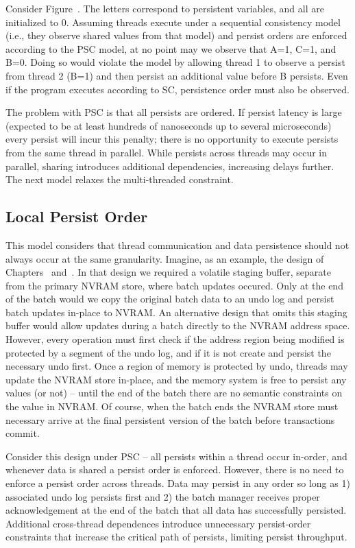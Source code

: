 Consider Figure~.
The letters correspond to persistent variables, and all are initialized to 0.
Assuming threads execute under a sequential consistency model (i.e., they observe shared values from that model) and persist orders are enforced according to the PSC model, at no point may we observe that A=1, C=1, and B=0.
Doing so would violate the model by allowing thread 1 to observe a persist from thread 2 (B=1) and then persist an additional value before B persists.
Even if the program executes according to SC, persistence order must also be observed.

The problem with PSC is that all persists are ordered.
If persist latency is large (expected to be at least hundreds of nanoseconds up to several microseconds) every persist will incur this penalty; there is no opportunity to execute persists from the same thread in parallel.
While persists across threads may occur in parallel, sharing introduces additional dependencies, increasing delays further.
The next model relaxes the multi-threaded constraint.

\subsection{Local Persist Order}
\label{sec:PMC:PersistenceModels:LPO}

This model considers that thread communication and data persistence should not always occur at the same granularity.
Imagine, as an example, the \GroupCommit design of Chapters~ and~.
In that design we required a volatile staging buffer, separate from the primary NVRAM store, where batch updates occured.
Only at the end of the batch would we copy the original batch data to an undo log and persist batch updates in-place to NVRAM.
An alternative design that omits this staging buffer would allow updates during a batch directly to the NVRAM address space.
However, every operation must first check if the address region being modified is protected by a segment of the undo log, and if it is not create and persist the necessary undo first.
Once a region of memory is protected by undo, threads may update the NVRAM store in-place, and the memory system is free to persist any values (or not) -- until the end of the batch there are no semantic constraints on the value in NVRAM.
Of course, when the batch ends the NVRAM store must necessary arrive at the final persistent version of the batch before transactions commit.

Consider this design under PSC -- all persists within a thread occur in-order, and whenever data is shared a persist order is enforced.
However, there is no need to enforce a persist order across threads.
Data may persist in any order so long as 1) associated undo log persists first and 2) the batch manager receives proper acknowledgement at the end of the batch that all data has successfully persisted.
Additional cross-thread dependences introduce unnecessary persist-order constraints that increase the critical path of persists, limiting persist throughput.

